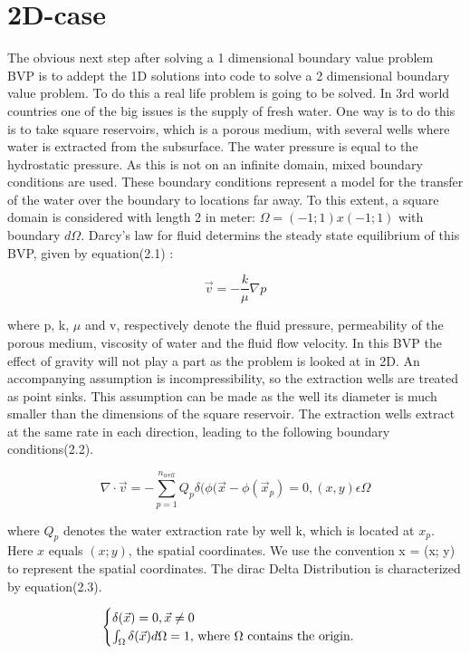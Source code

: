 \documentclass[a4paper]{report}
\begin{document}
\chapter{2D-case}


The obvious next step after solving a 1 dimensional boundary value problem BVP is to addept the 1D solutions into code to solve a 2 dimensional boundary value problem. To do this a real life problem is going to be solved. In 3rd world countries one of the big issues is the supply of fresh water. One way is to do this is to take square reservoirs, which is a porous medium, with several wells where water is extracted from the subsurface. The water pressure is equal to the hydrostatic pressure. As this is not on an infinite domain, mixed boundary conditions are used. These boundary conditions represent a model for the transfer of the water over the boundary to locations far away. To this extent, a square domain is considered with length 2 in meter: $\Omega= (-1; 1) x (-1; 1)$ with boundary $d\Omega$. Darcy's law for fluid determins the steady state equilibrium of this BVP, given by equation(2.1) :

\begin{equation}
\vec{v}=-\frac{k}{\mu}\nabla p
\end{equation}
\medskip

where p, k, $\mu$ and v, respectively denote the 
fluid pressure, permeability of the porous medium, viscosity of water and the fluid flow velocity. In this BVP the effect of gravity will not play a part as the problem is looked at in 2D. An accompanying assumption is incompressibility, so the extraction wells are treated as point sinks. This assumption can be made as the well its diameter is much smaller than the dimensions of the square reservoir. The extraction wells extract at the same rate in each direction, leading to the following boundary conditions(2.2).


\begin{equation}
	\nabla\cdot\vec{v}=-\sum_{p=1}^{n_{well}}Q_p\delta(\phi(\vec{x}-\phi(\vec{x}_p)=0,(x,y) \epsilon\Omega 
\end{equation}

where $Q_p$ denotes the water extraction rate by well k, which is located at $x_p$. Here $x$ equals $(x;y)$, the spatial coordinates.  We use the convention x = (x; y) to represent the spatial coordinates. The dirac Delta Distribution is characterized by equation(2.3).

\begin{equation}
	\begin{cases} 
		\delta(\vec{x}) = 0,\vec{x} \neq 0 \\ \int_{\Omega}\delta(\vec{x})d\Omega = 1,$  where $\Omega $  contains the origin.$
	\end{cases} 
\end{equation}
\end{document}

